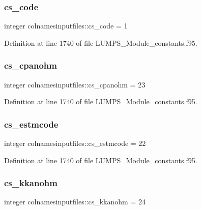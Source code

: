 \subsubsection{\texorpdfstring{cs\+\_\+code}{cs\_code}}
{\footnotesize\ttfamily integer colnamesinputfiles\+::cs\+\_\+code = 1}



Definition at line 1740 of file L\+U\+M\+P\+S\+\_\+\+Module\+\_\+constants.\+f95.

\mbox{\label{namespacecolnamesinputfiles_a703943b50c9fca1069fb4bf8dc1a1938}} 
\subsubsection{\texorpdfstring{cs\+\_\+cpanohm}{cs\_cpanohm}}
{\footnotesize\ttfamily integer colnamesinputfiles\+::cs\+\_\+cpanohm = 23}



Definition at line 1740 of file L\+U\+M\+P\+S\+\_\+\+Module\+\_\+constants.\+f95.

\mbox{\label{namespacecolnamesinputfiles_a9ec8d7169edb6eb99d629d83b0fd180f}} 
\subsubsection{\texorpdfstring{cs\+\_\+estmcode}{cs\_estmcode}}
{\footnotesize\ttfamily integer colnamesinputfiles\+::cs\+\_\+estmcode = 22}



Definition at line 1740 of file L\+U\+M\+P\+S\+\_\+\+Module\+\_\+constants.\+f95.

\mbox{\label{namespacecolnamesinputfiles_a03022e15ff7b5ee61681506cf7c51a2d}} 
\subsubsection{\texorpdfstring{cs\+\_\+kkanohm}{cs\_kkanohm}}
{\footnotesize\ttfamily integer colnamesinputfiles\+::cs\+\_\+kkanohm = 24}



